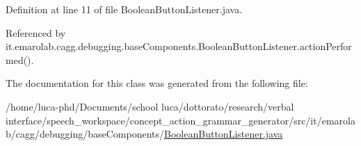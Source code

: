 Definition at line 11 of file Boolean\-Button\-Listener.\-java.



Referenced by it.\-emarolab.\-cagg.\-debugging.\-base\-Components.\-Boolean\-Button\-Listener.\-action\-Performed().



The documentation for this class was generated from the following file\-:\begin{DoxyCompactItemize}
\item 
/home/luca-\/phd/\-Documents/school luca/dottorato/research/verbal interface/speech\-\_\-workspace/concept\-\_\-action\-\_\-grammar\-\_\-generator/src/it/emarolab/cagg/debugging/base\-Components/\hyperlink{BooleanButtonListener_8java}{Boolean\-Button\-Listener.\-java}\end{DoxyCompactItemize}
